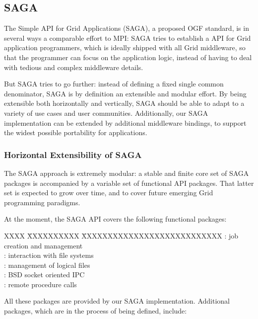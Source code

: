  \subsection*{SAGA}

  The Simple API for Grid Applications (SAGA), a proposed OGF
  standard, is in several ways a comparable effort to MPI: SAGA tries
  to establish a  API for Grid application programmers,
  which is ideally shipped with all Grid middleware, so that the
  programmer can focus on the application logic, instead of having to
  deal with tedious and complex middleware details.

  But SAGA tries to go further: instead of defining a fixed single
  common denominator, SAGA is by definition an extensible and modular
  effort. By being extensible both horizontally and vertically, SAGA
  should be able to adapt to a variety of use cases and user
  communities. Additionally, our SAGA implementation can be extended
  by additional middleware bindings, to support the widest possible
  portability for applications.


  \subsubsection*{Horizontal Extensibility of SAGA}

   The SAGA approach is extremely modular: a stable and finite core
   set of SAGA \LF packages is accompanied by a variable set of
   functional API packages.  That latter set is expected to grow over
   time, and to cover future emerging Grid programming paradigms.


   At the moment, the SAGA API covers the following functional
   packages:

   \begin{tabbing}
    XXXX      \= XXXXXXXXXX \= XXXXXXXXXXXXXXXXXXXXXXXXXXX \kill
    \> :    \> job creation and management\\
    \> :   \> interaction with file systems\\
    \> : \> management of logical files\\
    \> : \> BSD socket oriented IPC\\
    \> :     \> remote procedure calls
   \end{tabbing}

   All these packages are provided by our SAGA implementation.
   Additional packages, which are in the process of being defined,
   include:
   

